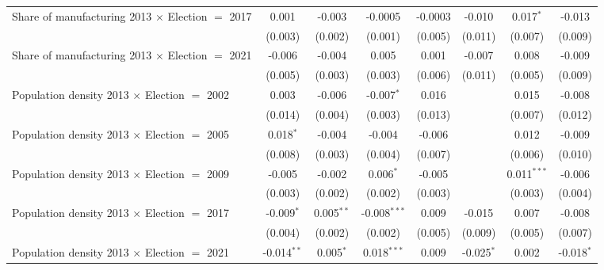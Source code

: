 \begin{table}[htbp]
\begin{tabular}{lccccccc}
      Share of manufacturing 2013 $\times$ Election $=$ 2017  & 0.001         & -0.003       & -0.0005        & -0.0003       & -0.010         & 0.017$^{*}$    & -0.013\\   
                                                              & (0.003)       & (0.002)      & (0.001)        & (0.005)       & (0.011)        & (0.007)        & (0.009)\\   
      Share of manufacturing 2013 $\times$ Election $=$ 2021  & -0.006        & -0.004       & 0.005          & 0.001         & -0.007         & 0.008          & -0.009\\   
                                                              & (0.005)       & (0.003)      & (0.003)        & (0.006)       & (0.011)        & (0.005)        & (0.009)\\   
      Population density 2013 $\times$ Election $=$ 2002      & 0.003         & -0.006       & -0.007$^{*}$   & 0.016         &                & 0.015          & -0.008\\   
                                                              & (0.014)       & (0.004)      & (0.003)        & (0.013)       &                & (0.007)        & (0.012)\\   
      Population density 2013 $\times$ Election $=$ 2005      & 0.018$^{*}$   & -0.004       & -0.004         & -0.006        &                & 0.012          & -0.009\\   
                                                              & (0.008)       & (0.003)      & (0.004)        & (0.007)       &                & (0.006)        & (0.010)\\   
      Population density 2013 $\times$ Election $=$ 2009      & -0.005        & -0.002       & 0.006$^{*}$    & -0.005        &                & 0.011$^{***}$  & -0.006\\   
                                                              & (0.003)       & (0.002)      & (0.002)        & (0.003)       &                & (0.003)        & (0.004)\\   
      Population density 2013 $\times$ Election $=$ 2017      & -0.009$^{*}$  & 0.005$^{**}$ & -0.008$^{***}$ & 0.009         & -0.015         & 0.007          & -0.008\\   
                                                              & (0.004)       & (0.002)      & (0.002)        & (0.005)       & (0.009)        & (0.005)        & (0.007)\\   
      Population density 2013 $\times$ Election $=$ 2021      & -0.014$^{**}$ & 0.005$^{*}$  & 0.018$^{***}$  & 0.009         & -0.025$^{*}$   & 0.002          & -0.018$^{*}$\\   

\end{tabular}
\end{table}
